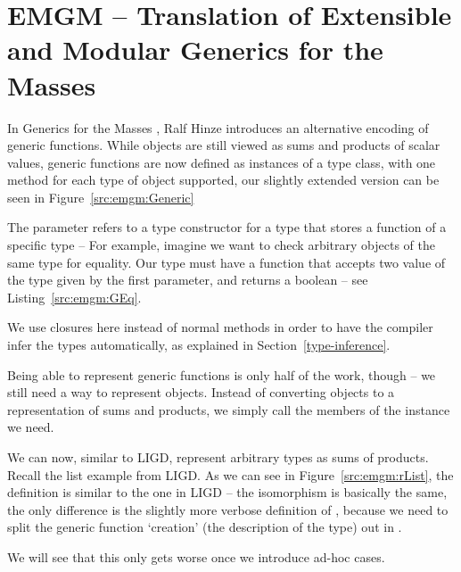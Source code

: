\section{EMGM -- Translation of Extensible and Modular Generics for the Masses}


In Generics for the Masses \cite{GM}, Ralf Hinze introduces an alternative
encoding of generic functions. While objects are still viewed as sums and
products of scalar values, generic functions are now defined as instances
of a  type class, with one method for each type of object
supported, our slightly extended version can be seen in Figure~\ref{src:emgm:Generic}

The parameter  refers to a type constructor for a type that stores
a function of a specific type -- For example, imagine we want to check
arbitrary objects of the same type for equality. Our type  must have a function that accepts two
value of the type given by the first parameter, and returns a boolean
-- see Listing~\ref{src:emgm:GEq}.


We use closures here instead of normal methods in order to have the
compiler infer the types automatically, as explained in Section~\ref{type-inference}.

Being able to represent generic functions is only half of the work, though
-- we still need a way to represent objects. Instead of converting objects
to a representation of sums and products, we simply call the members of
the  instance we need.



We can now, similar to  LIGD, represent arbitrary types as sums of products.
Recall the list example from LIGD.
As we can see in Figure~\ref{src:emgm:rList}, the definition is similar to
the one in LIGD
-- the isomorphism is basically the same, the only difference is the slightly
more verbose definition of , because we need to split the generic
function `creation' (the description of the type) out in .

We will see that this only gets worse once we introduce ad-hoc cases.


